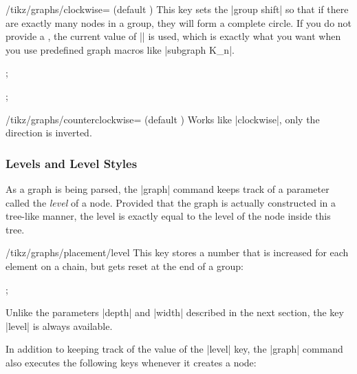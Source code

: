 \label{key-graphs-clockwise}%
\begin{key}{/tikz/graphs/clockwise= (default \string\tikzgraphVnum)}
  This key sets the |group shift| so that if there are exactly
   many nodes in a group, they will form a complete
  circle. If you do not provide a , the current value of
  |\tikzgraphVnum| is used, which is exactly what you want when you
  use predefined graph macros like |subgraph K_n|.
\begin{codeexample}[]
\tikz {};
\end{codeexample}
\begin{codeexample}[]
\tikz {};
\end{codeexample}
\end{key}

\label{key-graphs-counterclockwise}%
\begin{key}{/tikz/graphs/counterclockwise= (default \string\tikzgraphVnum)}
  Works like |clockwise|, only the direction is inverted.
\end{key}


\subsubsection{Levels and Level Styles}

As a graph is being parsed, the |graph| command keeps track of a
parameter called the \emph{level} of a node. Provided that the graph
is actually constructed in a tree-like manner, the level is exactly
equal to the level of the node inside this tree.

\begin{key}{/tikz/graphs/placement/level}
  This key stores a number that is increased for each element on a
  chain, but gets reset at the end of a group:
\begin{codeexample}[]
\tikz {};
\end{codeexample}
  Unlike the parameters |depth| and |width| described in the next
  section, the key |level| is always available.
\end{key}

In addition to keeping track of the value of the |level| key, the
|graph| command also executes the following keys whenever it creates a
node:

